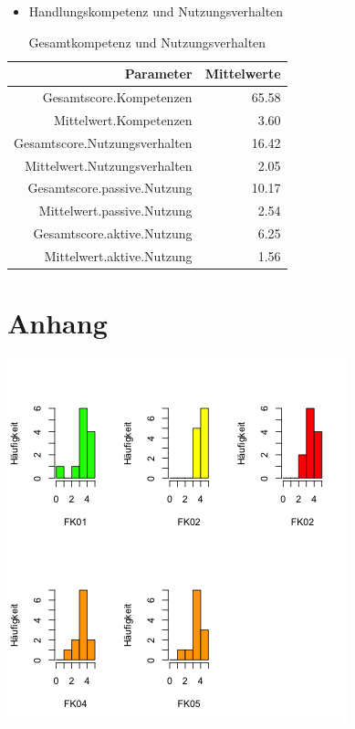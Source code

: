 \documentclass[12pt, bibliography=totoc]{scrartcl}
\begin{document}
\begin{itemize}
\tightlist
\item
  Handlungskompetenz und Nutzungsverhalten
\end{itemize}

\begin{table}[H]
\centering
\caption{Gesamtkompetenz und Nutzungsverhalten}
\begin{tabular}{rr}
  \hline
 Parameter & Mittelwerte\\
  \hline
Gesamtscore.Kompetenzen & 65.58 \\
  Mittelwert.Kompetenzen & 3.60 \\
  Gesamtscore.Nutzungsverhalten & 16.42 \\
  Mittelwert.Nutzungsverhalten & 2.05 \\
  Gesamtscore.passive.Nutzung & 10.17 \\
  Mittelwert.passive.Nutzung & 2.54 \\
  Gesamtscore.aktive.Nutzung & 6.25 \\
  Mittelwert.aktive.Nutzung & 1.56 \\
   \hline
\end{tabular}
\end{table}

\pagebreak

\pagebreak
\printbibliography
\pagebreak
\appendix


  \section{Anhang}
  \includegraphics{Anhang/schoen.png}
  


%
%
\end{document}
